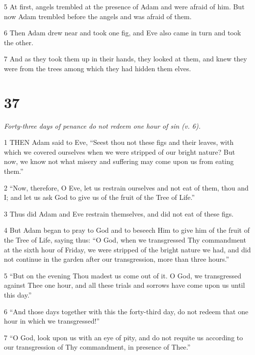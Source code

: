 \par 5 At first, angels trembled at the presence of Adam and were afraid of him. But now Adam trembled before the angels and was afraid of them.

\par 6 Then Adam drew near and took one fig, and Eve also came in turn and took the other.

\par 7 And as they took them up in their hands, they looked at them, and knew they were from the trees among which they had hidden them elves.

\chapter{37}

\par \textit{Forty-three days of penance do not redeem one hour of sin (v. 6).}

\par 1 THEN Adam said to Eve, “Seest thou not these figs and their leaves, with which we covered ourselves when we were stripped of our bright nature? But now, we know not what misery and suffering may come upon us from eating them.”

\par 2 “Now, therefore, O Eve, let us restrain ourselves and not eat of them, thou and I; and let us ask God to give us of the fruit of the Tree of Life.”

\par 3 Thus did Adam and Eve restrain themselves, and did not eat of these figs.

\par 4 But Adam began to pray to God and to beseech Him to give him of the fruit of the Tree of Life, saying thus: “O God, when we transgressed Thy commandment at the sixth hour of Friday, we were stripped of the bright nature we had, and did not continue in the garden after our transgression, more than three hours.”

\par 5 “But on the evening Thou madest us come out of it. O God, we transgressed against Thee one hour, and all these trials and sorrows have come upon us until this day.”

\par 6 “And those days together with this the forty-third day, do not redeem that one hour in which we transgressed!”

\par 7 “O God, look upon us with an eye of pity, and do not requite us according to our transgression of Thy commandment, in presence of Thee.”

